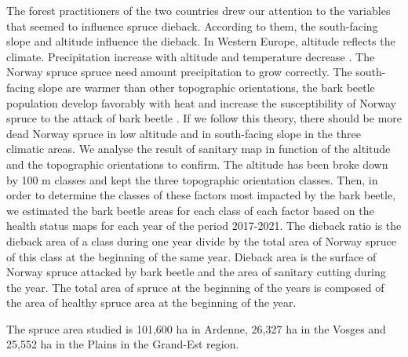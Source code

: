 \documentclass[3p,procedia]{elsarticle}
\begin{document}
The forest practitioners of the two countries drew our attention to the variables that seemed to influence spruce dieback.
According to them, the south-facing slope and altitude influence the dieback.
In Western Europe, altitude reflects the climate. Precipitation increase with altitude and temperature decrease . 
The Norway spruce spruce need  amount precipitation to grow correctly.
The south- facing slope are warmer than other topographic orientations, the bark beetle 
population develop favorably with heat \citep{annila_influence_1969, baier_phenipscomprehensive_2007, jonsson_2009, marini_climate_2012} and increase the susceptibility of Norway spruce to the attack of bark beetle \citep{wermelinger_ecology_2004, netherer_waterlimiting_2015}.
If we follow this theory, there should be more dead Norway spruce in low altitude and in south-facing slope in the three climatic areas.  
We analyse the result of sanitary map in function of the altitude and the topographic orientations to confirm.
The altitude has been broke down  by 100 m classes and kept the three topographic orientation classes.
Then, in order to determine the classes of these factors most impacted by the bark beetle, we estimated the bark beetle areas for each class of each factor based on the health status maps for each year of the period 2017-2021.
The dieback ratio is  the dieback area of a class during one year divide by the total area of Norway spruce of this class at the beginning of the same year. 
Dieback area is the surface of Norway spruce attacked by bark beetle and the area of sanitary cutting during the year. 
The total area of spruce at the beginning of the years is composed of the area of healthy spruce area at the beginning of the year. 



The spruce area studied is 101,600 ha in Ardenne, 26,327 ha in the Vosges and 25,552 ha in the Plains in the Grand-Est region.

  
			
\end{document}
